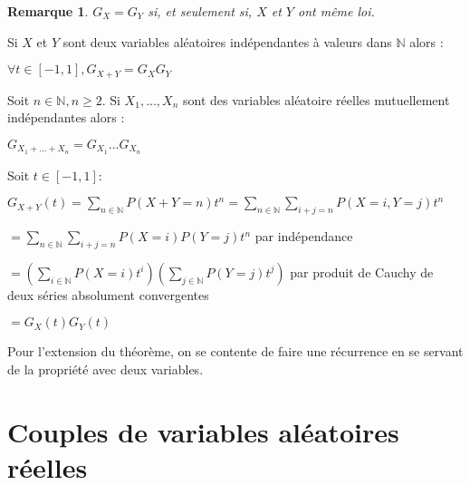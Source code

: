 \documentclass[a4paper,12pt]{book}
\newcommand{\Thr}[2]{\begin{tcolorbox}[sharp corners, colback=white,colframe=red!90!black!75, title=Théorème : #1]#2\end{tcolorbox}}
\newcommand{\Pre}[1]{\begin{tcolorbox}[sharp corners, colback=white,colframe=green!60!green!30!black!75, title=Preuve]#1\end{tcolorbox}}
\newtheorem{Rem}{Remarque}[section]
\def\N{\mathbb{N}}
\begin{document}
\begin{Rem}
$G_X=G_Y$ si, et seulement si, $X$ et $Y$ ont même loi.
\end{Rem}
\Thr{}{Si $X$ et $Y$ sont deux variables aléatoires indépendantes à valeurs dans $\N$ alors :\par\begin{center}$\forall t\in[-1,1], G_{X+Y}=G_XG_Y$\end{center}
\par Soit $n\in\N, n\geq 2$. Si $X_1,...,X_n$ sont des variables aléatoire réelles mutuellement indépendantes alors : \par\begin{center}$G_{X_1+...+X_n}=G_{X_1}...G_{X_n}$\end{center}}
\Pre{Soit $t\in[-1,1]$:
\par $G_{X+Y}(t)=\sum\limits_{n\in\N}P(X+Y=n)t^n =\sum\limits_{n\in\N}\sum\limits_{i+j=n}P(X=i,Y=j)t^n$
\par $= \sum\limits_{n\in\N}\sum\limits_{i+j=n}P(X=i)P(Y=j)t^n$ par indépendance
\par $=\left(\sum\limits_{i\in\N}P(X=i)t^i\right) \left(\sum\limits_{j\in\N}P(Y=j)t^j\right)$ par produit de Cauchy de deux séries absolument convergentes
\par $=G_X(t)G_Y(t)$
\par Pour l'extension du théorème, on se contente de faire une récurrence en se servant de la propriété avec deux variables.}


\section{Couples de variables aléatoires réelles}
\end{document}
